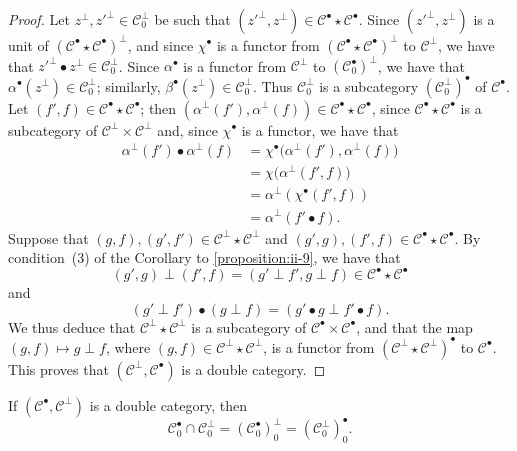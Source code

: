 \documentclass[a4paper,fleqn]{article}
\theoremstyle{plain}
\newenvironment{proposition}[1]
  {\renewcommand\theinnerproposition{#1}\innerproposition}
  {\endinnerproposition}
\theoremstyle{definition}
\newcommand{\CC}{\mathcal{C}}
\begin{document}
\begin{proof}
  Let $z^\perp,z'^\perp\in\CC_0^\perp$ be such that $(z'^\perp,z^\perp)\in\CC^\bullet\star\CC^\bullet$.
  Since $(z'^\perp,z^\perp)$ is a unit of $(\CC^\bullet\star\CC^\bullet)^\perp$, and since $\chi^\bullet$ is a functor from $(\CC^\bullet\star\CC^\bullet)^\perp$ to $\CC^\perp$, we have that $z'^{\perp}\bullet z^\perp\in\CC_0^\perp$.
  Since $\alpha^\bullet$ is a functor from $\CC^\perp$ to $(\CC_0^\bullet)^\perp$, we have that $\alpha^\bullet(z^\perp)\in\CC_0^\perp$;
  similarly, $\beta^\bullet(z^\perp)\in\CC_0^\perp$.
  Thus $\CC_0^\perp$ is a subcategory $(\CC_0^\perp)^\bullet$ of $\CC^\bullet$.
  Let $(f',f)\in\CC^\bullet\star\CC^\bullet$;
  then $(\alpha^\perp(f'),\alpha^\perp(f))\in\CC^\bullet\star\CC^\bullet$, since $\CC^\bullet\star\CC^\bullet$ is a subcategory of $\CC^\perp\times\CC^\perp$ and, since $\chi^\bullet$ is a functor, we have that
  \[
    \begin{aligned}
      \alpha^\perp(f')\bullet\alpha^\perp(f)
      &= \chi^\bullet\big(
        \alpha^\perp(f'), \alpha^\perp(f)
      \big)
    \\&= \chi\big(
        \alpha^\perp(f',f)
      \big)
    \\&= \alpha^\perp(\chi^\bullet(f',f))
    \\&= \alpha^\perp(f'\bullet f).
    \end{aligned}
  \]
  Suppose that $(g,f),(g',f')\in\CC^\perp\star\CC^\perp$ and $(g',g),(f',f)\in\CC^\bullet\star\CC^\bullet$.
  By condition~(3) of the Corollary to \cref{proposition:ii-9}, we have that
  \[
    (g',g)\perp(f',f)
    = (g'\perp f',g\perp f)
    \in\CC^\bullet\star\CC^\bullet
  \]
  and
  \[
    (g'\perp f')\bullet(g\perp f)
    = (g'\bullet g\perp f'\bullet f).
  \]
  We thus deduce that $\CC^\perp\star\CC^\perp$ is a subcategory of $\CC^\bullet\times\CC^\bullet$, and that the map $(g,f)\mapsto g\perp f$, where $(g,f)\in\CC^\perp\star\CC^\perp$, is a functor from $(\CC^\perp\star\CC^\perp)^\bullet$ to $\CC^\bullet$.
  This proves that $(\CC^\perp,\CC^\bullet)$ is a double category.
\end{proof}

\begin{proposition}{10}
\label{proposition:ii-10}
  If $(\CC^\bullet,\CC^\perp)$ is a double category, then
  \[
    \CC_0^\bullet\cap\CC_0^\perp
    = (\CC_0^\bullet)_0^\perp
    = (\CC_0^\perp)_0^\bullet.
  \]
\end{proposition}
\end{document}
